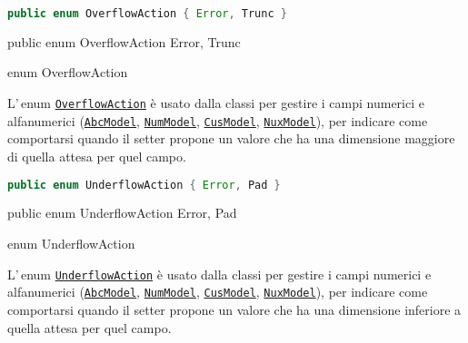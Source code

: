 \ifesource
\begin{lstlisting}[language=java, 
caption=enum OverflowAction, 
label=lst:OverflowAction]
public enum OverflowAction { Error, Trunc }
\end{lstlisting}
\else
\begin{elisting}
\begin{javacode}
public enum OverflowAction { Error, Trunc }
\end{javacode}
\caption{enum OverflowAction}\label{lst:OverflowAction}
\end{elisting}
\fi
L'\,enum \hyperref[lst:OverflowAction]{\texttt{OverflowAction}} è usato dalla 
classi per gestire i campi numerici e alfanumerici 
(\hyperref[lst:AbcModel]{\texttt{AbcModel}},\break
\hyperref[lst:NumModel]{\texttt{NumModel}},
\hyperref[lst:CusModel]{\texttt{CusModel}},
\hyperref[lst:NuxModel]{\texttt{NuxModel}}), per indicare come comportarsi
quando il setter propone un valore che ha una dimensione maggiore di quella
attesa per quel campo.

\ifesource
\begin{lstlisting}[language=java, 
caption=enum UnderflowAction, 
label=lst:UnderflowAction]
public enum UnderflowAction { Error, Pad }
\end{lstlisting}
\else
\begin{elisting}
\begin{javacode}
public enum UnderflowAction { Error, Pad }
\end{javacode}
\caption{enum UnderflowAction}\label{lst:UnderflowAction}
\end{elisting}
\fi
L'\,enum \hyperref[lst:UnderflowAction]{\texttt{UnderflowAction}} è usato dalla 
classi per gestire i campi numerici e alfanumerici 
(\hyperref[lst:AbcModel]{\texttt{AbcModel}},\break
\hyperref[lst:NumModel]{\texttt{NumModel}},
\hyperref[lst:CusModel]{\texttt{CusModel}},
\hyperref[lst:NuxModel]{\texttt{NuxModel}}), per indicare come comportarsi
quando il setter propone un valore che ha una dimensione inferiore a quella
attesa per quel campo.

